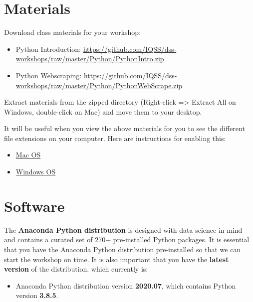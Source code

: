\documentclass[
]{book}
\providecommand{\tightlist}{%
  \setlength{\itemsep}{0pt}\setlength{\parskip}{0pt}}
\begin{document}
\hypertarget{materials-1}{%
\section{Materials}\label{materials-1}}

Download class materials for your workshop:

\begin{itemize}
\tightlist
\item
  Python Introduction: \url{https://github.com/IQSS/dss-workshops/raw/master/Python/PythonIntro.zip}
\item
  Python Webscraping: \url{https://github.com/IQSS/dss-workshops/raw/master/Python/PythonWebScrape.zip}
\end{itemize}

Extract materials from the zipped directory (Right-click =\textgreater{} Extract All on Windows, double-click on Mac) and move them to your desktop.

It will be useful when you view the above materials for you to see the different file extensions on your computer. Here are instructions for enabling this:

\begin{itemize}
\tightlist
\item
  \href{https://support.apple.com/guide/mac-help/show-or-hide-filename-extensions-on-mac-mchlp2304/mac}{Mac OS}
\item
  \href{http://kb.winzip.com/kb/entry/26/}{Windows OS}
\end{itemize}

\hypertarget{software-1}{%
\section{Software}\label{software-1}}

The \textbf{Anaconda Python distribution} is designed with data science in mind and contains a curated set of 270+ pre-installed Python packages. It is essential that you have the Anaconda Python distribution pre-installed so that we can start the workshop on time. It is also important that you have the \textbf{latest version} of the distribution, which currently is:

\begin{itemize}
\tightlist
\item
  Anaconda Python distribution version \textbf{2020.07}, which contains Python version \textbf{3.8.5}.
\end{itemize}
\end{document}
